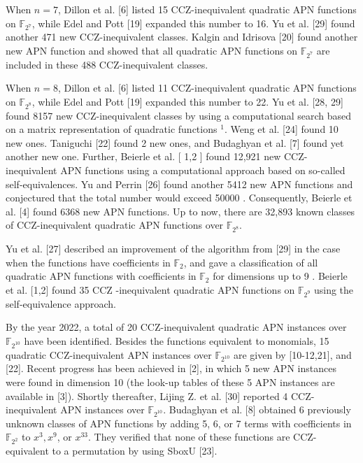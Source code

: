 \documentclass[10pt]{article}
\begin{document}
When $n=7$, Dillon et al. [6] listed 15 CCZ-inequivalent quadratic APN functions on $\mathbb{F}_{2^{7}}$, while Edel and Pott [19] expanded this number to 16. Yu et al. [29] found\\[0pt]
another 471 new CCZ-inequivalent classes. Kalgin and Idrisova [20] found another new APN function and showed that all quadratic APN functions on $\mathbb{F}_{2^{7}}$ are included in these 488 CCZ-inequivalent classes.

When $n=8$, Dillon et al. [6] listed 11 CCZ-inequivalent quadratic APN functions on $\mathbb{F}_{2^{8}}$, while Edel and Pott [19] expanded this number to 22. Yu et al. [28, 29] found 8157 new CCZ-inequivalent classes by using a computational search based on a matrix representation of quadratic functions ${ }^{1}$. Weng et al. [24] found 10 new ones. Taniguchi [22] found 2 new ones, and Budaghyan et al. [7] found yet another new one. Further, Beierle et al. [ 1,2 ] found 12,921 new CCZ-inequivalent APN functions using a computational approach based on so-called self-equivalences. Yu and Perrin [26] found another 5412 new APN functions and conjectured that the total number would exceed 50000 . Consequently, Beierle et al. [4] found 6368 new APN functions. Up to now, there are 32,893 known classes of CCZ-inequivalent quadratic APN functions over $\mathbb{F}_{2^{8}}$.

Yu et al. [27] described an improvement of the algorithm from [29] in the case when the functions have coefficients in $\mathbb{F}_{2}$, and gave a classification of all quadratic APN functions with coefficients in $\mathbb{F}_{2}$ for dimensions up to 9 . Beierle et al. [1,2] found 35 CCZ -inequivalent quadratic APN functions on $\mathbb{F}_{2^{9}}$ using the self-equivalence approach.

By the year 2022, a total of 20 CCZ-inequivalent quadratic APN instances over $\mathbb{F}_{2^{10}}$ have been identified. Besides the functions equivalent to monomials, 15 quadratic CCZ-inequivalent APN instances over $\mathbb{F}_{2^{10}}$ are given by [10-12,21], and [22]. Recent progress has been achieved in [2], in which 5 new APN instances were found in dimension 10 (the look-up tables of these 5 APN instances are available in [3]). Shortly thereafter, Lijing Z. et al. [30] reported 4 CCZ- inequivalent APN instances over $\mathbb{F}_{2^{10}}$. Budaghyan et al. [8] obtained 6 previously unknown classes of APN functions by adding 5, 6, or 7 terms with coefficients in $\mathbb{F}_{2^{2}}$ to $x^{3}, x^{9}$, or $x^{33}$. They verified that none of these functions are CCZ-equivalent to a permutation by using SboxU [23].
\end{document}
